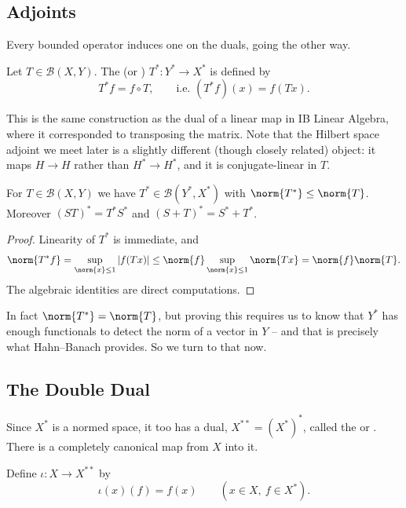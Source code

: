 \documentclass[a4paper]{scrartcl}
\newcommand{\Bop}{\mathcal{B}}
\begin{document}
\subsection{Adjoints}

Every bounded operator induces one on the duals, going the other way.

\begin{definition}[Adjoint]
	Let $T \in \Bop(X,Y)$. The  (or ) $T^* : Y^* \to X^*$ is defined by
	$$T^* f = f \circ T, \qquad \text{i.e.\ } (T^*f)(x) = f(Tx).$$
\end{definition}

This is the same construction as the dual of a linear map in IB Linear Algebra, where it corresponded to transposing the matrix. Note that the Hilbert space adjoint we meet later is a slightly different (though closely related) object: it maps $H \to H$ rather than $H^* \to H^*$, and it is conjugate-linear in $T$.

\begin{proposition}
	For $T \in \Bop(X,Y)$ we have $T^* \in \Bop(Y^*, X^*)$ with $\norm{T^*} \leq \norm{T}$. Moreover $(ST)^* = T^*S^*$ and $(S+T)^* = S^* + T^*$.
\end{proposition}

\begin{proof}
	Linearity of $T^*$ is immediate, and
	$$\norm{T^*f} = \sup_{\norm{x}\leq 1} |f(Tx)| \leq \norm{f} \sup_{\norm{x} \leq 1}\norm{Tx} = \norm{f}\norm{T}.$$
	The algebraic identities are direct computations.
\end{proof}

In fact $\norm{T^*} = \norm{T}$, but proving this requires us to know that $Y^*$ has enough functionals to detect the norm of a vector in $Y$ -- and that is precisely what Hahn--Banach provides. So we turn to that now.

\subsection{The Double Dual}

Since $X^*$ is a normed space, it too has a dual, $X^{**} = (X^*)^*$, called the  or . There is a completely canonical map from $X$ into it.

\begin{definition}
	Define $\iota : X \to X^{**}$ by
	$$\iota(x)(f) = f(x) \qquad (x \in X, \ f \in X^*).$$
\end{definition}
\end{document}
